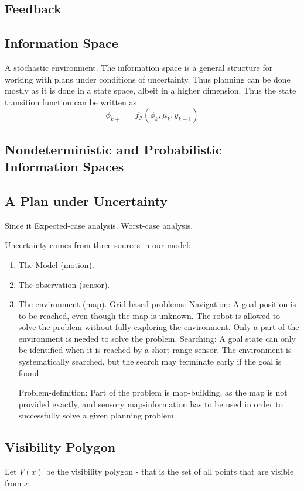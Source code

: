 \subsection{Feedback}

\subsection{Information Space}
A stochastic environment. The information space is a general structure for
working with plans under conditions of uncertainty. Thus planning can be done
mostly as it is done in a state space, albeit in a higher dimension. Thus the
state transition function can be written as
\[
  \phi_{k+1} = f_{\mathcal{I}}\left( \phi_k, \mu_k, y_{k+1} \right)
\]

\subsection{Nondeterministic and Probabilistic Information Spaces}

\subsection{A Plan under Uncertainty}
Since it Expected-case analysis. Worst-case analysis.

Uncertainty comes from three sources in our model:
\begin{enumerate}
\item The Model (motion).
\item The observation (sensor).
\item The environment (map). Grid-based problems: Navigation: A goal position is
  to be reached, even though the map is unknown. The robot is allowed to solve
  the problem without fully exploring the environment. Only a part of the
  environment is needed to solve the problem. Searching: A goal state can only
  be identified when it is reached by a short-range sensor. The environment is
  systematically searched, but the search may terminate early if the goal is
  found.

  Problem-definition: Part of the problem is map-building, as the map is not
  provided exactly, and sensory map-information has to be used in order to
  successfully solve a given planning problem.
\end{enumerate}

\subsection{Visibility Polygon}
Let \(V(x)\) be the visibility polygon - that is the set of all points that are
visible from \(x\).

